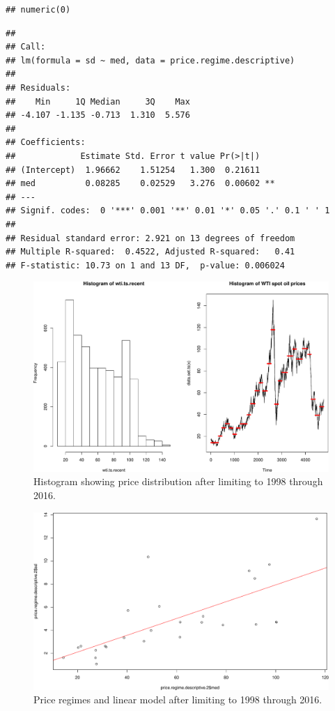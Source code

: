 \documentclass[11pt,]{article}
\begin{document}
\begin{verbatim}
## numeric(0)
\end{verbatim}

\begin{verbatim}
## 
## Call:
## lm(formula = sd ~ med, data = price.regime.descriptive)
## 
## Residuals:
##    Min     1Q Median     3Q    Max 
## -4.107 -1.135 -0.713  1.310  5.576 
## 
## Coefficients:
##             Estimate Std. Error t value Pr(>|t|)   
## (Intercept)  1.96662    1.51254   1.300  0.21611   
## med          0.08285    0.02529   3.276  0.00602 **
## ---
## Signif. codes:  0 '***' 0.001 '**' 0.01 '*' 0.05 '.' 0.1 ' ' 1
## 
## Residual standard error: 2.921 on 13 degrees of freedom
## Multiple R-squared:  0.4522, Adjusted R-squared:   0.41 
## F-statistic: 10.73 on 1 and 13 DF,  p-value: 0.006024
\end{verbatim}

\begin{figure}[htbp]
\centering
\includegraphics{Figs/unnamed-chunk-13-1.pdf}
\caption{Histogram showing price distribution after limiting to 1998
through 2016.}
\end{figure}

\begin{figure}[htbp]
\centering
\includegraphics{Figs/unnamed-chunk-15-1.pdf}
\caption{Price regimes and linear model after limiting to 1998 through
2016.}
\end{figure}
\end{document}
